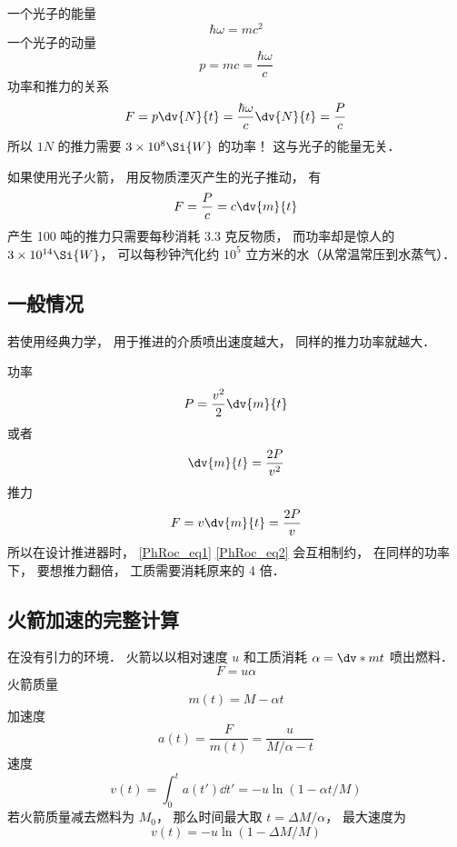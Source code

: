 
\begin{issues}
\issueDraft
\end{issues}

一个光子的能量
\begin{equation}
\hbar\omega = mc^2
\end{equation}
一个光子的动量
\begin{equation}
p = mc = \frac{\hbar\omega}{c}
\end{equation}
功率和推力的关系
\begin{equation}
F = p \dv{N}{t} = \frac{\hbar\omega}{c}\dv{N}{t} = \frac{P}{c}
\end{equation}
所以 $1N$ 的推力需要 $3\times 10^8\Si{W}$ 的功率！ 这与光子的能量无关．

如果使用光子火箭， 用反物质湮灭产生的光子推动， 有
\begin{equation}
F = \frac{P}{c} = c\dv{m}{t}
\end{equation}
产生 100 吨的推力只需要每秒消耗 3.3 克反物质， 而功率却是惊人的 $3\times 10^{14}\Si{W}$， 可以每秒钟汽化约 $10^5$ 立方米的水（从常温常压到水蒸气）．

\subsection{一般情况}
若使用经典力学， 用于推进的介质喷出速度越大， 同样的推力功率就越大．

功率
\begin{equation}
P = \frac{v^2}{2}\dv{m}{t}
\end{equation}
或者
\begin{equation}\label{PhRoc_eq1}
\dv{m}{t} = \frac{2P}{v^2}
\end{equation}
推力
\begin{equation}\label{PhRoc_eq2}
F = v\dv{m}{t} = \frac{2P}{v}
\end{equation}
所以在设计推进器时， \autoref{PhRoc_eq1} \autoref{PhRoc_eq2} 会互相制约， 在同样的功率下， 要想推力翻倍， 工质需要消耗原来的 4 倍．

\subsection{火箭加速的完整计算}
在没有引力的环境． 火箭以以相对速度 $u$ 和工质消耗 $\alpha = \dv*{m}{t}$  喷出燃料．
\begin{equation}
F = u\alpha
\end{equation}
火箭质量
\begin{equation}
m(t) = M - \alpha t
\end{equation}
加速度
\begin{equation}
a(t) = \frac{F}{m(t)} = \frac{u}{M/\alpha - t}
\end{equation}
速度
\begin{equation}
v(t) = \int_0^t a(t') \dd{t'} = -u \ln(1 - \alpha t / M)
\end{equation}
若火箭质量减去燃料为 $M_0$， 那么时间最大取 $t = \Delta M/\alpha$， 最大速度为
\begin{equation}
v(t) = -u \ln(1 - \Delta M / M)
\end{equation}
